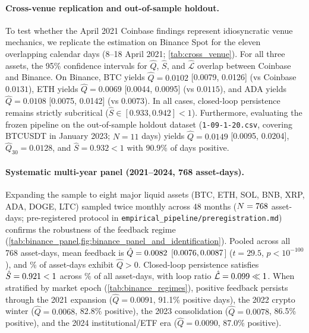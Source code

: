 \documentclass[10pt,twocolumn,letterpaper]{article}
\theoremstyle{definition}
\theoremstyle{remark}
\begin{document}
\paragraph{Cross-venue replication and out-of-sample holdout.} To test whether the April 2021 Coinbase findings represent idiosyncratic venue mechanics, we replicate the estimation on Binance Spot for the eleven overlapping calendar days (8--18 April 2021; \cref{tab:cross_venue}). For all three assets, the 95\% confidence intervals for $\hat Q$, $\hat S$, and $\hat{\mathcal L}$ overlap between Coinbase and Binance. On Binance, BTC yields $\hat Q = 0.0102$ [0.0079, 0.0126] (vs Coinbase $0.0131$), ETH yields $\hat Q = 0.0069$ [0.0044, 0.0095] (vs $0.0115$), and ADA yields $\hat Q = 0.0108$ [0.0075, 0.0142] (vs $0.0073$). In all cases, closed-loop persistence remains strictly subcritical ($\hat S \in [0.933, 0.942] < 1$). Furthermore, evaluating the frozen pipeline on the out-of-sample holdout dataset (\texttt{1-09-1-20.csv}, covering BTCUSDT in January 2023; $N=11$ days) yields $\hat Q = 0.0149$ [0.0095, 0.0204], $\hat Q_{30} = 0.0128$, and $\hat S = 0.932 < 1$ with $90.9\%$ of days positive.

\paragraph{Systematic multi-year panel (2021--2024, 768 asset-days).} Expanding the sample to eight major liquid assets (BTC, ETH, SOL, BNB, XRP, ADA, DOGE, LTC) sampled twice monthly across 48 months ($N = 768$ asset-days; pre-registered protocol in \texttt{empirical\_pipeline/preregistration.md}) confirms the robustness of the feedback regime (\cref{tab:binance_panel,fig:binance_panel_and_identification}). Pooled across all 768 asset-days, mean feedback is $\hat Q = 0.0082$ [$0.0076, 0.0087$] ($t = 29.5$, $p < 10^{-100}$), and \PanelQPosShare\% of asset-days exhibit $\hat Q > 0$. Closed-loop persistence satisfies $\hat S = 0.921 < 1$ across \PanelSSubcriticalShare\% of all asset-days, with loop ratio $\hat{\mathcal L} = 0.099 \ll 1$. When stratified by market epoch (\cref{tab:binance_regimes}), positive feedback persists through the 2021 expansion ($\hat Q = 0.0091$, 91.1\% positive days), the 2022 crypto winter ($\hat Q = 0.0068$, 82.8\% positive), the 2023 consolidation ($\hat Q = 0.0078$, 86.5\% positive), and the 2024 institutional/ETF era ($\hat Q = 0.0090$, 87.0\% positive).
\end{document}
